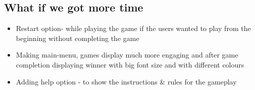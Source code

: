 \documentclass[12pt]{article}
\begin{document}
\subsection{What if we got more time}
\begin{itemize}
    \item Restart option- while playing the game if the users wanted to play from the beginning without completing the game
    \item Making main-menu, games display much more engaging and after game completion displaying winner with big font size and with different colours
    \item Adding help option - to show the instructions \& rules for the gameplay
\end{itemize}
\nocite{*}

\end{document}
